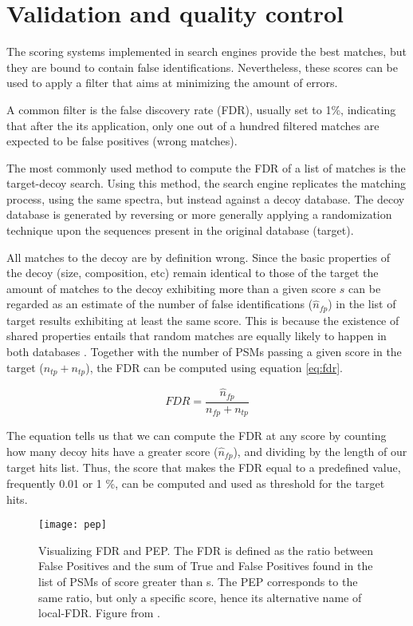 \documentclass[thesis]{subfiles}
\begin{document}
\section{Validation and quality control}
\label{sec:validation}

The scoring systems implemented in search engines provide the best matches, but they are bound to contain false identifications. Nevertheless, these scores can be used to apply a filter that aims at minimizing the amount of errors.

A common filter is the false discovery rate (FDR), usually set to 1\%, indicating that after the its application, only one out of a hundred filtered matches are expected to be false positives (wrong matches).

The most commonly used method to compute the \ac{FDR} of a list of matches is the target-decoy search. Using this method, the search engine replicates the matching process, using the same spectra, but instead against a decoy database. The decoy database is generated by reversing or more generally applying a randomization technique upon the sequences present in the original database (target). 

All matches to the decoy are by definition wrong. Since the basic properties of the decoy (size, composition, etc) remain identical to those of the target the amount of matches to the decoy exhibiting more than a given score $s$ can be regarded as an estimate of the number of false identifications ($\hat{n}_{fp}$) in the list of target results exhibiting at least the same score. This is because the existence of shared properties entails that random matches are equally likely to happen in both databases \cite{Elias2010}. Together with the number of PSMs passing a given score in the target ($n_{tp} + n_{tp}$), the FDR can be computed using equation \ref{eq:fdr}.

\begin{equation}\label{eq:fdr}
FDR = \frac{\hat{n}_{fp}}{n_{fp} + n_{tp}}
\end{equation}

The equation tells us that we can compute the FDR at any score by counting how many decoy hits have a greater score ($\hat{n}_{fp}$), and dividing by the length of our target hits list. Thus, the score that makes the FDR equal to a predefined value, frequently 0.01 or 1 \%, can be computed and used as threshold for the target hits.

\begin{figure}[!h]
\centering
\texttt{[image: pep]}
\caption{Visualizing FDR and PEP. The FDR is defined as the ratio between False Positives and the sum of True and False Positives found in the list of PSMs of score greater than s. The PEP corresponds to the same ratio, but only a specific score, hence its alternative name of local-FDR. Figure from \cite{Kall2008}.}
\label{fig:pep}
\end{figure}
\end{document}
